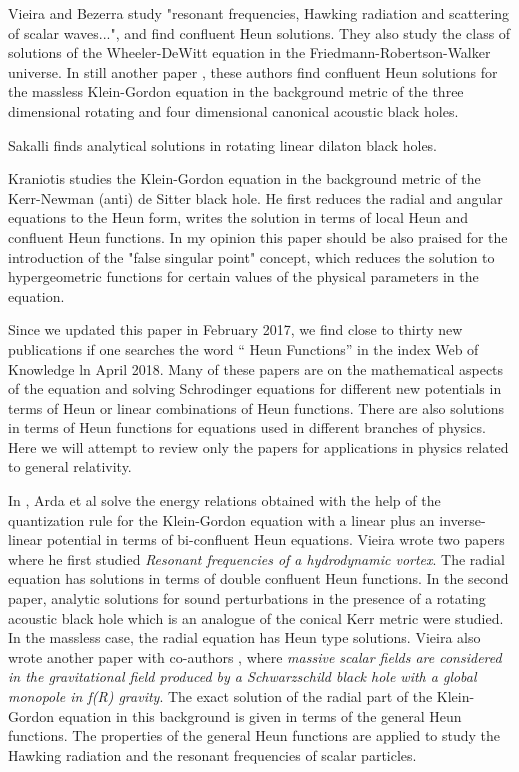 \documentclass{article}
\begin{document}
\noindent
Vieira and Bezerra \cite{Vieira3} study  "resonant frequencies,
Hawking radiation and scattering of scalar waves...", and find
confluent Heun solutions. They also study \cite{Vieira4} the class
of solutions of the Wheeler-DeWitt equation in the
Friedmann-Robertson-Walker universe. In still another paper
\cite{Vieira5}, these authors find confluent Heun solutions for
the massless Klein-Gordon equation  in the background metric of
the three dimensional rotating and four dimensional canonical
acoustic black holes.

\noindent
 Sakalli \cite{sakalli25} finds analytical solutions in rotating
linear dilaton black holes.

\noindent
Kraniotis \cite {G.V.} studies the
Klein-Gordon equation in the background metric of the Kerr-Newman
(anti) de Sitter black hole. He first reduces the radial and
angular equations to the Heun form, writes the solution in terms
of local Heun   and confluent Heun functions. In my opinion this
paper should be also praised for the introduction of the "false
singular point" concept, which reduces the solution to
hypergeometric functions for certain values of the physical
parameters in the equation.

Since we updated this paper in February 2017, we find close to  thirty new publications if one searches the word “ Heun Functions” in the index  Web of Knowledge ln April 2018. Many of these papers are on the mathematical aspects of the equation and solving Schrodinger equations for different new potentials in terms of Heun or linear combinations of Heun functions. There are also solutions in terms of Heun functions for equations used in different branches of physics. Here we will attempt to review only the papers for applications in physics related to general relativity.

In \cite{Tezcan}, Arda et al  solve the energy relations obtained with the help of the quantization rule for the Klein-Gordon equation with a linear plus an inverse-linear potential in terms of bi-confluent Heun equations.
Vieira wrote two papers \cite {H.S.1, H.S.2} where he first studied \emph{Resonant frequencies of a hydrodynamic vortex}. The radial equation has solutions in terms of double confluent Heun functions. In the second paper, analytic solutions  for sound perturbations in the presence of a rotating acoustic black hole which is an analogue of the conical Kerr metric  were studied. In the massless case, the radial equation has Heun type solutions. 
Vieira also wrote another paper with co-authors \cite {H.S.3}, where \emph{massive scalar fields are considered in the gravitational field produced by a Schwarzschild black hole with a global monopole in f(R) gravity}. The exact solution of the radial part of the Klein-Gordon equation in this background is given in terms of the general Heun functions. The properties of the general Heun functions are applied to study the Hawking radiation and the resonant frequencies of scalar particles.
\end{document}
